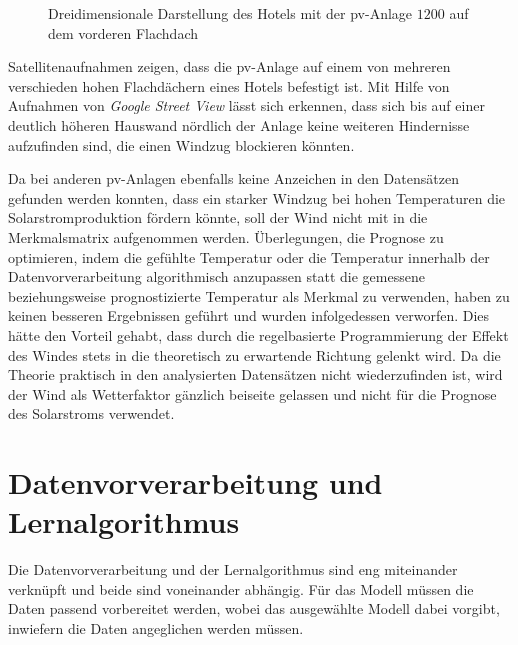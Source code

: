 \documentclass[12pt, a4paper]{article}
\begin{document}

\begin{figure}
\centering
\def\svgwidth{425pt}

\caption{Dreidimensionale Darstellung des Hotels mit der \ac{pv}-Anlage $1200$ auf dem vorderen Flachdach}
\label{pic:solarsystem_1200_picture}
\end {figure}

Satellitenaufnahmen zeigen, dass die \ac{pv}-Anlage auf einem von mehreren verschieden hohen Flachdächern eines Hotels befestigt ist. Mit Hilfe von Aufnahmen von \textit{Google Street View} lässt sich erkennen, dass sich bis auf einer deutlich höheren Hauswand nördlich der Anlage keine weiteren Hindernisse aufzufinden sind, die einen Windzug blockieren könnten.

Da bei anderen \ac{pv}-Anlagen ebenfalls keine Anzeichen in den Datensätzen gefunden werden konnten, dass ein starker Windzug bei hohen Temperaturen die Solarstromproduktion fördern könnte, soll der Wind nicht mit in die Merkmalsmatrix aufgenommen werden. Überlegungen, die Prognose zu optimieren, indem die gefühlte Temperatur oder die Temperatur innerhalb der Datenvorverarbeitung algorithmisch anzupassen statt die gemessene beziehungsweise prognostizierte Temperatur als Merkmal zu verwenden, haben zu keinen besseren Ergebnissen geführt und wurden infolgedessen verworfen. Dies hätte den Vorteil gehabt, dass durch die regelbasierte Programmierung der Effekt des Windes stets in die theoretisch zu erwartende Richtung gelenkt wird. Da die Theorie praktisch in den analysierten Datensätzen nicht wiederzufinden ist, wird der Wind als Wetterfaktor gänzlich beiseite gelassen und nicht für die Prognose des Solarstroms verwendet.


\newpage

\section{Datenvorverarbeitung und Lernalgorithmus}
\label{sec:data_algorithm}

Die Datenvorverarbeitung und der Lernalgorithmus sind eng miteinander verknüpft und beide sind voneinander abhängig. Für das Modell müssen die Daten passend vorbereitet werden, wobei das ausgewählte Modell dabei vorgibt, inwiefern die Daten angeglichen werden müssen. 
\end{document}
